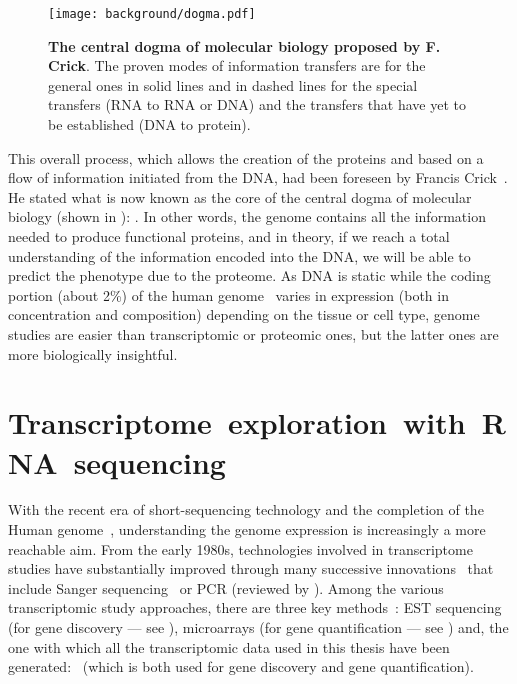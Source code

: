 \begin{figure}[!htbp]
    \texttt{[image: background/dogma.pdf]}\centering
    \vspace{-4mm}
    \caption[Central dogma of molecular biology proposed by F. Crick]%
    {\label{fig:dogma}\textbf{The central dogma of molecular biology proposed by
    F. Crick}. The proven modes of information transfers are for the general ones
    in solid lines and in dashed lines for the special transfers
    (\gls{RNA} to \gls{RNA} or \gls{DNA}) and the transfers that have yet to
    be established (\gls{DNA} to protein).
    }
\end{figure}

This overall process, which allows the creation of the proteins and
based on a flow of information initiated from the \gls{DNA},
had been foreseen by Francis Crick~.
He stated what is now known as the core of the central dogma of molecular biology
(shown in ):
.
In other words, the genome contains all the information needed to produce
functional proteins,
and in theory, if we reach a total understanding of the information encoded
into the \gls{DNA},
we will be able to predict the \gls{phenotype} due to the proteome.
As \gls{DNA} is static
while the coding portion (about 2\%) of the human genome~
varies in expression (both in concentration and composition)
depending on the tissue or cell type,
genome studies are easier than transcriptomic or proteomic ones,
but the latter ones are more biologically insightful.
\begin{comment}
There are different types of proteins: ubiquitous ones
(generally qualified as \emph{housekeeping}),
cell/tissue/condition specific ones and
everything in-between.
\end{comment}

\section[Transcriptome exploration with RNA sequencing]%
{Transcriptome~exploration~with~RNA~sequencing}

With the recent era of short-sequencing technology and the completion of the
Human genome~,
understanding the genome expression is increasingly a more
reachable aim.
From the early 1980s,
technologies involved in transcriptome studies
have substantially improved through many successive innovations~
that include Sanger sequencing~ or
\gls{PCR} (reviewed by \citet{VanGuilder2008-xs}).
Among the various transcriptomic study approaches,
there are three key methods~:
\gls{EST} sequencing (for gene discovery --- see ),
microarrays (for gene quantification --- see )
and, the one with which all the transcriptomic data used in this thesis have
been generated:
\Rnaseq\ (which is both used for gene discovery and gene quantification).

